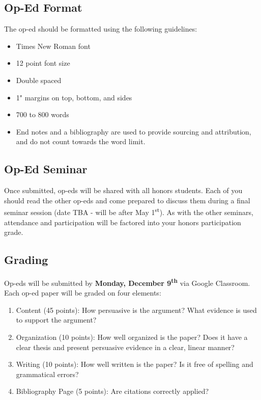 \documentclass[]{book}
\providecommand{\tightlist}{%
  \setlength{\itemsep}{0pt}\setlength{\parskip}{0pt}}
\begin{document}
\hypertarget{op-ed-format}{%
\subsection{Op-Ed Format}\label{op-ed-format}}

The op-ed should be formatted using the following guidelines:

\begin{itemize}
\tightlist
\item
  Times New Roman font
\item
  12 point font size
\item
  Double spaced
\item
  1" margins on top, bottom, and sides
\item
  700 to 800 words
\item
  End notes and a bibliography are used to provide sourcing and attribution, and do not count towards the word limit.
\end{itemize}

\hypertarget{op-ed-seminar}{%
\subsection{Op-Ed Seminar}\label{op-ed-seminar}}

Once submitted, op-eds will be shared with all honors students. Each of you should read the other op-eds and come prepared to discuss them during a final seminar session (date TBA - will be after May 1\textsuperscript{st}). As with the other seminars, attendance and participation will be factored into your honors participation grade.

\hypertarget{grading-2}{%
\subsection{Grading}\label{grading-2}}

Op-eds will be submitted by \textbf{Monday, December 9\textsuperscript{th}} via Google Classroom. Each op-ed paper will be graded on four elements:

\begin{enumerate}
\def\labelenumi{\arabic{enumi}.}
\tightlist
\item
  Content (45 points): How persuasive is the argument? What evidence is used to support the argument?
\item
  Organization (10 points): How well organized is the paper? Does it
  have a clear thesis and present persuasive evidence in a clear, linear manner?
\item
  Writing (10 points): How well written is the paper? Is it free of
  spelling and grammatical errors?
\item
  Bibliography Page (5 points): Are citations correctly applied?
\end{enumerate}
\end{document}
